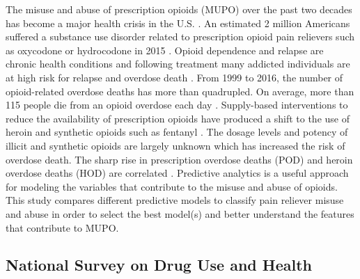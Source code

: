 \documentclass[sigconf]{acmart}
\begin{document}
The misuse and abuse of prescription opioids (MUPO) over the past two 
decades has become a major health crisis in the U.S. \cite{volkow14}. 
An estimated 2 million Americans suffered a substance use disorder related 
to prescription opioid pain relievers such as oxycodone or hydrocodone 
in 2015 \cite{nida18}. Opioid dependence and relapse are chronic health 
conditions and following treatment many addicted individuals are at high 
risk for relapse and overdose death \cite{shaham03}. From 1999 to 2016, 
the number of opioid-related overdose deaths has more than quadrupled. 
On average, more than 115 people die from an opioid overdose each day 
\cite{cdc18, judd16}. Supply-based interventions to reduce the availability 
of prescription opioids have produced a shift to the use of heroin and 
synthetic opioids such as fentanyl \cite{jones15}. The dosage levels and 
potency of illicit and synthetic opioids are largely unknown which has
increased the risk of overdose death. The sharp rise in prescription 
overdose deaths (POD) and heroin overdose deaths (HOD) are correlated 
\cite{muhuri13, unick13}. Predictive analytics is a useful approach for 
modeling the variables that contribute to the misuse and abuse of 
opioids. This study compares different predictive models to classify 
pain reliever misuse and abuse in order to select the best model(s) and
better understand the features that contribute to MUPO. 


\subsection{National Survey on Drug Use and Health} 
\end{document}
